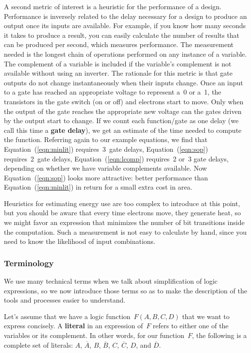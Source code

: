 A second metric of interest is a heuristic for the performance of a design.
%
Performance is inversely related to the delay necessary for a design
to produce an output once its inputs are available.  For example, if
you know how many seconds it takes to produce a result, you can easily
calculate the number of results that can be produced per second, which 
measures performance.
%
The measurement needed is the longest chain of operations
performed on any instance of a variable.  The complement of
a variable is included if the variable's complement is not 
available without using an inverter.
%
The rationale for this metric is that gate outputs do not change 
instantaneously when their inputs
change. Once an input to a gate has reached an appropriate voltage to represent 
a~0 or a~1, the transistors in the gate switch (on or off) and electrons 
start to move.
Only when the output of the gate reaches the appropriate new voltage 
can the gates driven by the output start to change. 
If we count each
function/gate as one delay (we call this time a {\bf gate delay}), we 
get an estimate of the time needed to compute
the function.
%
Referring again to our example equations, we find that
Equation~(\ref{eqn:minlit}) requires~3~gate delays,
Equation~(\ref{eqn:sop}) requires~2~gate delays,
Equation~(\ref{eqn:lcomp}) requires~2 or~3 gate delays, depending
on whether we have variable complements available.  Now 
Equation~(\ref{eqn:sop}) looks more attractive: better performance than
Equation~(\ref{eqn:minlit}) in return for a small extra cost in area.

Heuristics for estimating energy use are too 
complex to introduce at this point, 
but you should be aware that every time electrons move, they
generate heat, so we might favor an expression that minimizes the number
of bit transitions inside the computation.  Such a measurement is
not easy to calculate by hand,
since you need to know the likelihood of input combinations.\\


\subsubsection{Terminology}

We use many technical terms when we talk about simplification of
logic expressions, so we now introduce those terms so as to make
the description of the tools and processes easier to understand.

Let's assume that we have a logic function~$F(A,B,C,D)$ that we want
to express concisely.  A {\bf literal} in an expression of~$F$ refers 
to either one of the variables or its complement.  In other words,
for our function~$F$, the following is a complete set of literals:
$A$, $\overline{A}$, $B$, $\overline{B}$,
$C$, $\overline{C}$, $D$, and $\overline{D}$.

